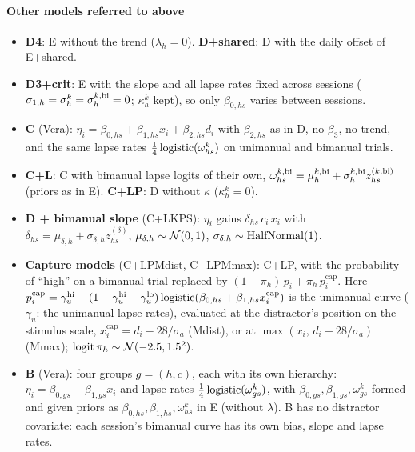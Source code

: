 \paragraph{Other models referred to above}
\begin{itemize}
\item \textbf{D4}: E without the trend ($\lambda_h=0$). \textbf{D+shared}: D with the daily offset of E+shared.
\item \textbf{D3+crit}: E with the slope and all lapse rates fixed across sessions ($\sigma_{1,h}=\sigma^{k}_{h}=\sigma^{k,\mathrm{bi}}_{h}=0$; $\kappa^k_h$ kept), so only $\beta_{0,hs}$ varies between sessions.
\item \textbf{C} (Vera): $\eta_i=\beta_{0,hs}+\beta_{1,hs}x_i+\beta_{2,hs}d_i$ with $\beta_{2,hs}$ as in D, no $\beta_3$, no trend, and the same lapse rates $\tfrac14\operatorname{logistic}(\omega^k_{hs})$ on unimanual and bimanual trials.
\item \textbf{C+L}: C with bimanual lapse logits of their own, $\omega^{k,\mathrm{bi}}_{hs}=\mu^{k,\mathrm{bi}}_h+\sigma^{k,\mathrm{bi}}_h z^{(k,\mathrm{bi})}_{hs}$ (priors as in E). \textbf{C+LP}: D without $\kappa$ ($\kappa^k_h=0$).
\item \textbf{D + bimanual slope} (C+LKPS): $\eta_i$ gains $\delta_{hs}\,c_i\,x_i$ with $\delta_{hs}=\mu_{\delta,h}+\sigma_{\delta,h}z^{(\delta)}_{hs}$, $\mu_{\delta,h}\sim\mathcal{N}(0,1)$, $\sigma_{\delta,h}\sim\operatorname{HalfNormal}(1)$.
\item \textbf{Capture models} (C+LPMdist, C+LPMmax): C+LP, with the probability of ``high'' on a bimanual trial replaced by $(1-\pi_h)\,p_i+\pi_h\,p^{\mathrm{cap}}_i$. Here $p^{\mathrm{cap}}_i=\gamma^{\mathrm{hi}}_{u}+(1-\gamma^{\mathrm{hi}}_{u}-\gamma^{\mathrm{lo}}_{u})\operatorname{logistic}(\beta_{0,hs}+\beta_{1,hs}x^{\mathrm{cap}}_i)$ is the unimanual curve ($\gamma_u$: the unimanual lapse rates), evaluated at the distractor's position on the stimulus scale, $x^{\mathrm{cap}}_i=d_i-28/\sigma_a$ (Mdist), or at $\max(x_i,\,d_i-28/\sigma_a)$ (Mmax); $\operatorname{logit}\pi_h\sim\mathcal{N}(-2.5,1.5^2)$.
\item \textbf{B} (Vera): four groups $g=(h,c)$, each with its own hierarchy: $\eta_i=\beta_{0,gs}+\beta_{1,gs}x_i$ and lapse rates $\tfrac14\operatorname{logistic}(\omega^k_{gs})$, with $\beta_{0,gs},\beta_{1,gs},\omega^k_{gs}$ formed and given priors as $\beta_{0,hs},\beta_{1,hs},\omega^k_{hs}$ in E (without $\lambda$). B has no distractor covariate: each session's bimanual curve has its own bias, slope and lapse rates.
\end{itemize}

